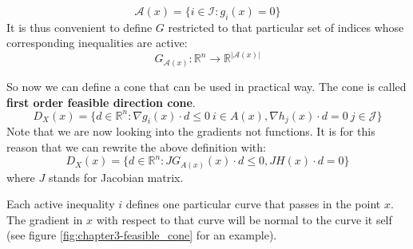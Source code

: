\begin{equation}
    \mathcal{A}(x) = \{i \in \mathcal{I} : g_i(x) = 0\}
\end{equation}
It is thus convenient to define $G$ restricted to that particular set of indices whose corresponding inequalities are active:
\begin{equation}
    G_{\mathcal{A}(x)} : \mathbb{R}^n \rightarrow \mathbb{R}^{|\mathcal{A}(x)|}
\end{equation}
\par So now we can define a cone that can be used in practical way. The cone is called \textbf{first order feasible direction cone}.
\begin{equation}
    D_X(x) = \{d \in \mathbb{R}^n : \nabla g_i(x) \cdot d \leq 0\ i \in A(x), \nabla h_j(x) \cdot d  = 0\ j \in \mathcal{J}\}
\end{equation}
Note that we are now looking into the gradients not functions. It is for this reason that we can rewrite the above definition with:
\begin{equation}
    D_X(x) = \{d \in \mathbb{R}^n : JG_{A(x)}(x) \cdot d \leq 0, JH(x) \cdot d = 0\}
\end{equation}
where $J$ stands for Jacobian matrix.
\par Each active inequality $i$ defines one particular curve that passes in the point $x$. The gradient in $x$ with respect to that curve will be normal to the curve it self (see figure \ref{fig:chapter3-feasible_cone} for an example).
